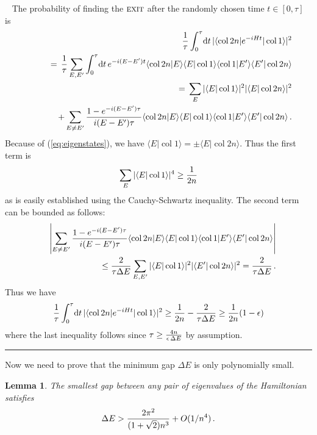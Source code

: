 \documentclass[aps,11pt,twoside,nofootinbib,tightenlines,superscriptaddress,preprintnumbers]{revtex4}
\newcommand{\<}{\langle}
\renewcommand{\>}{\rangle}
\newcommand{\be}{\begin{equation}}
\newcommand{\ee}{\end{equation}}
\newcommand{\bea}{\begin{eqnarray}}
\newcommand{\eea}{\end{eqnarray}}
\newcommand{\exit}{{\textsc{exit}}}
\renewcommand{\d}{{\mathrm{d}}}
\newcommand{\col}{\mathop{\mathrm{col}}\nolimits}
\newtheorem{lemma}[theorem]{Lemma}
\newcommand{\qed}{\rule{7pt}{7pt}}
\newenvironment{proof}
  {\trivlist\item\noindent{\bf Proof}~}
  {\qed\endtrivlist}
\begin{document}
\begin{proof}
The probability of finding the $\exit$ after the randomly chosen time $t
\in [0,\tau]$ is
\bea
  && {1 \over \tau} \int_0^\tau \! \d t \,
     |\<\col 2n|e^{-i H t}|\col 1\>|^2 \nonumber\\
  &&\qquad = \, {1 \over \tau} \sum_{E,E'} \int_0^\tau \! \d t \, 
                e^{-i(E-E')t} \<\col 2n|E\>\<E|\col 1\> 
                              \<\col 1|E'\>\<E'|\col 2n\> \\
  &&\qquad = \, \sum_E |\<E|\col 1\>|^2 |\<E|\col 2n\>|^2 \nonumber\\
  &&\qquad ~ \,\, + \sum_{E \ne E'} {1 - e^{-i(E-E')\tau} \over i(E-E')\tau}
	      \<\col 2n|E\>\<E|\col 1\> \<\col 1|E'\>\<E'|\col 2n\>
\,.
\eea
Because of (\ref{eq:eigenstates}), we have $\<E|\col 1\>=\pm\<E|\col
2n\>$.  Thus the first term is
\be
  \sum_E |\<E|\col 1\>|^4 \ge {1 \over 2n}
\ee
as is easily established using the Cauchy-Schwartz inequality.  The second
term can be bounded as follows:
\bea
  && \left |\sum_{E \ne E'} {1 - e^{-i(E-E')\tau} \over i(E-E')\tau}
           \<\col 2n|E\>\<E|\col 1\> 
           \<\col 1|E'\>\<E'|\col 2n\> \right| \nonumber\\
  && \qquad \le {2 \over \tau \Delta E} 
     \sum_{E,E'} |\<E|\col 1\>|^2 |\<E'|\col 2n\>|^2
    ={2 \over \tau \Delta E}
\,.
\eea
Thus we have
\be
  {1 \over \tau} \int_0^\tau \! \d t \, |\<\col 2n|e^{-i H t}|\col 1\>|^2
  \ge {1 \over 2n} - {2 \over \tau \Delta E}
  \ge {1 \over 2n} (1-\epsilon)
\ee
where the last inequality follows since $\tau \ge {4 n \over \epsilon \,
\Delta E}$ by assumption.
\end{proof}

Now we need to prove that the minimum gap $\Delta E$ is only polynomially
small.

\begin{lemma}\label{lemma:gap}
The smallest gap between any pair of eigenvalues of the Hamiltonian
satisfies
\be
  \Delta E > {2 \pi^2 \over (1+\sqrt2)n^3} + O(1/n^4)
\,.
\ee
\end{lemma}
\end{document}
